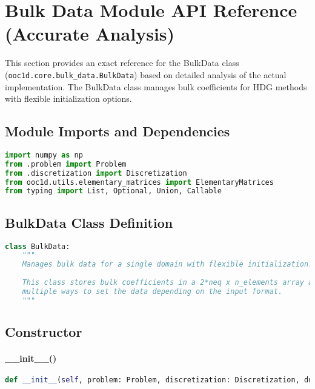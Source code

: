 %

\section{Bulk Data Module API Reference (Accurate Analysis)}
\label{sec:bulk_data_module_api}

This section provides an exact reference for the BulkData class (\texttt{ooc1d.core.bulk\_data.BulkData}) based on detailed analysis of the actual implementation. The BulkData class manages bulk coefficients for HDG methods with flexible initialization options.

\subsection{Module Imports and Dependencies}

\begin{lstlisting}[language=Python, caption=Module Dependencies]
import numpy as np
from .problem import Problem 
from .discretization import Discretization
from ooc1d.utils.elementary_matrices import ElementaryMatrices
from typing import List, Optional, Union, Callable
\end{lstlisting}

\subsection{BulkData Class Definition}
\label{subsec:bulk_data_class_definition}

\begin{lstlisting}[language=Python, caption=Class Declaration]
class BulkData:
    """
    Manages bulk data for a single domain with flexible initialization.
    
    This class stores bulk coefficients in a 2*neq x n_elements array and provides
    multiple ways to set the data depending on the input format.
    """
\end{lstlisting}

\subsection{Constructor}
\label{subsec:bulk_data_constructor}

\paragraph{\_\_init\_\_()}\leavevmode
\begin{lstlisting}[language=Python, caption=BulkData Constructor]
def __init__(self, problem: Problem, discretization: Discretization, dual: bool = False)
\end{lstlisting}

